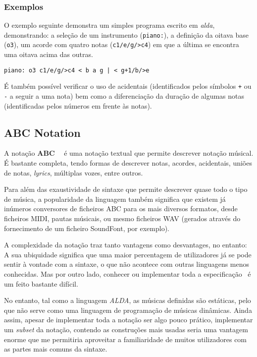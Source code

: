 \subsubsection{Exemplos}
O exemplo seguinte demonstra um simples programa escrito em \textit{alda}, demonstrando: a seleção de um instrumento (\texttt{piano:}), a definição da oitava base (\texttt{o3}), um acorde com quatro notas (\texttt{c1/e/g/>c4}) em que a última se encontra uma oitava acima das outras.
\begin{lstlisting}[caption={Exemplo da linguagem alda}]
piano: o3 c1/e/g/>c4 < b a g | < g+1/b/>e
\end{lstlisting}
 É também possível verificar o uso de acidentais (identificados pelos símbolos \texttt{+} ou \texttt{-} a seguir a uma nota) bem como a diferenciação da duração de algumas notas (identificadas pelos números em frente às notas).
\subsection{ABC Notation}
A notação \textbf{ABC}~\cite{AbcPlus}~\cite{abc-notation} é uma notação textual que permite descrever notação músical. É bastante completa, tendo formas de descrever notas, acordes, acidentais, uniões de notas, \textit{lyrics}, múltiplas vozes, entre outros.

Para além das exaustividade de sintaxe que permite descrever quase todo o tipo de música, a popularidade da linguagem também significa que existem já inúmeros conversores de ficheiros ABC para os mais diversos formatos, desde ficheiros MIDI, pautas músicais, ou mesmo ficheiros WAV (gerados através do fornecimento de um ficheiro SoundFont, por exemplo).

A complexidade da notação traz tanto vantagens como desvantages, no entanto: A sua ubiquidade significa que uma maior percentagem de utilizadores já se pode sentir à vontade com a sintaxe, o que não acontece com outras linguagens menos conhecidas. Mas por outro lado, conhecer ou implementar toda a especificação~\cite{abc-notation-standard} é um feito bastante difícil.

No entanto, tal como a linguagem \textit{ALDA}, as músicas definidas são estáticas, pelo que não serve como uma linguagem de programação de músicas dinâmicas. Ainda assim, apesar de implementar toda a notação ser algo pouco prático, implementar um \textit{subset} da notação, contendo as construções mais usadas seria uma vantagem enorme que me permitiria aproveitar a familiaridade de muitos utilizadores com as partes mais comuns da sintaxe.

